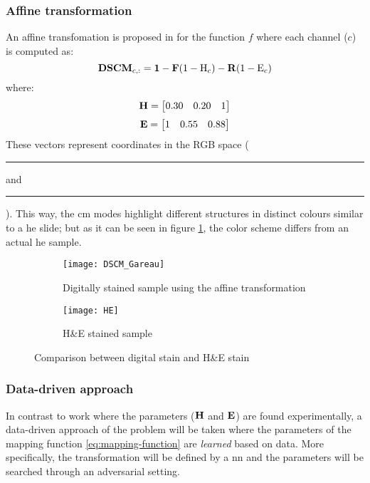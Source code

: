 \documentclass[../main.tex]{subfiles}
\begin{document}
\subsubsection{Affine transformation}
\label{sec:affine-transformation}
An affine transfomation is proposed in \cite{Gareau2009} for the function $f$
where each channel ($c$) is computed as:
\begin{equation} \label{eq:affine-transformation}
	\mathbf{DSCM}_{c,:} = \mathbf{1}
	- \mathbf{F} (1 - \text{H}_c) - \mathbf{R} (1 - \text{E}_c)
\end{equation}
where:
$$ \mathbf{H} = \begin{bmatrix} 0.30 & 0.20 & 1 \end{bmatrix} $$
$$ \mathbf{E} = \begin{bmatrix} 1 & 0.55 & 0.88 \end{bmatrix} $$
These vectors represent coordinates in the RGB space (
\textcolor{Hcolor}{\rule{0.7\baselineskip}{0.7\baselineskip}} and
\textcolor{Ecolor}{\rule{0.7\baselineskip}{0.7\baselineskip}}).
This way, the \gls{cm} modes highlight different structures in distinct
colours similar to a \gls{he} slide; but as it can be seen in figure \ref{fig:affine-example},
the color scheme differs from an actual \gls{he} sample.

\begin{figure}[h]
\centering
\begin{subfigure}{.5\textwidth}
  \centering
  \texttt{[image: DSCM\_Gareau]}
  \caption{Digitally stained sample using the affine transformation}
\end{subfigure}%
\begin{subfigure}{.5\textwidth}
  \centering
  \texttt{[image: HE]}
  \caption{H\&E stained sample}
\end{subfigure}
\caption{Comparison between digital stain and H\&E stain}
\label{fig:affine-example}
\end{figure}

\subsubsection{Data-driven approach}
In contrast to \cite{Gareau2009} work where the parameters
($\mathbf{H}$ and $\mathbf{E}$) are found experimentally, a data-driven approach
of the problem will be taken where the parameters of the mapping function
\ref{eq:mapping-function} are \emph{learned} based on data.
More specifically, the transformation will be defined by a \gls{nn} and the parameters
will be searched through an adversarial setting.
\end{document}
